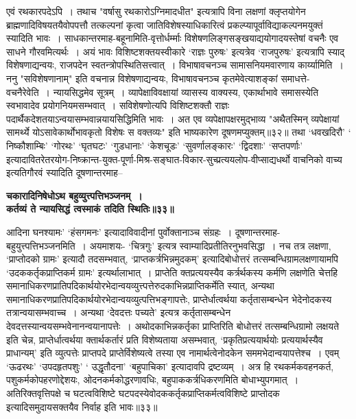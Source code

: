 {{{{एवं रथकारपदेऽपि~।
तथाच "वर्षासु रथकारोऽग्निमादधीत" इत्यत्रापि विना लक्षणां क्लृप्तयोगेन ब्राह्मणादिविषयतयैवोपपत्तौ तत्कल्पनां कृत्वा जातिविशेषस्याधिकारित्वं प्रकल्प्यापूर्वाविद्याकल्पनमयुक्तं स्यादिति भावः~।
 साधकान्तरमाह-बहूनामिति-वृत्तोर्धर्म्माः विशेषणलिङ्गसङ्खयाद्ययोगादयस्तेषां वचनैः {एव} साधने गौरवमित्यर्थः~।
 अयं भावः विशिष्टशक्तयस्वीकारे `राज्ञः पुरुषः' इत्यत्रेव `राजपुरुषः' इत्यत्रापि स्याद् विशेषणाद्यन्वयः, राजपदेन स्वतन्त्रोपस्थितिसत्त्वात्~।
विभाषावचनञ्च सामासनियमवारणाय कार्य्यामिति~।
 ननु "सविशेषणानाम्" इति वचनान्न विशेषणाद्यन्वयः, विभाषावचनञ्च कृतमेवेत्याशङ्कां समाधत्ते-वचनैरेवेति~।
न्यायसिद्धमेव सूत्रम्~।
व्यापेक्षाविवक्षायां {व्यासस्य} वाक्यस्य, एकार्थाभावे समासस्येति स्वभावादेव प्रयोगनियमसम्भवात्~।
सविशेषणोत्यपि विशिष्टशक्तौ राज्ञः पदार्थैकदेशतयाऽन्वयासम्भवान्नयायसिद्धिमिति भावः~।
 अत एव व्यपेक्षापक्षरमुद्भाव्य "अथैतस्मिन् व्यपेक्षायां सामर्थ्ये योऽसावेकार्थोभावकृतो विशेषः स वक्तव्यः" इति भाष्यकारेण दूषणमप्युक्तम्॥३२॥
 तथा `धवखदिरौ' ` निष्कौशाम्बिः' `गोरथः' `घृतघटः' `गुडधानाः' `केशचूडः' `सुवर्णालङ्कारः' `द्विदशाः' `सप्तपर्णाः' इत्यादावितरेतरयोग-निष्क्रान्त-युक्त-पूर्णा-मिश्र-सङ्घात-विकार-सुच्प्रत्ययलोप-वीप्साद्यधर्थो वाचनिको वाच्य इत्यतिगौरवं स्यादिति दूषणान्तरमाह--
\begin{center}{\bfseries चकारादिनिषेधोऽथ बहुव्युत्त्पत्तिभञ्जनम्~।\\
कर्तव्यं ते न्यायसिद्धं त्वस्माकं तदिति स्थितिः॥३३॥ }\end{center}
 आदिना घनश्यामः' `हंसगमनः' इत्यादाविवादीनां पुर्वोक्तानाञ्च संग्रहः~।
दूषणान्तरमाह-बहुयुत्त्पत्तिभञ्जनमिति~।
अयमाशयः- `चित्रगुः' इत्यत्र स्वाम्यादिप्रतीतिरनुभवसिद्धा~।
 नच तत्र लक्षणा, `प्राप्तोदको ग्रामः' इत्यादौ तदसम्भवात्, `प्राप्तकर्त्रभिन्नमुदकम्' इत्यादिबोधोत्तरं तत्सम्बन्धिग्रामलक्षणायामपि `उदककर्तृकप्राप्तिकर्म ग्रामः' इत्यर्थालाभात्~।
 प्राप्तेति क्तप्रत्ययस्यैव कर्त्रर्थकस्य कर्मणि लक्षणेति चेत्तहि समानाधिकरणप्रातिपदिकार्थयोरभेदान्वयव्युत्त्पत्तेरुदकाभिन्नप्राप्तिकर्मेति स्यात्, अन्यथा समानाधिकरणप्रातिपदिकार्थयोरभेदान्वयव्युत्पत्तिभङ्गापत्तेः, प्राप्तेर्धात्वर्थया कर्तृतासम्बन्धेन भेदेनोदकस्य तत्रान्वयासम्भवाच्च~।
अन्यथा `देवदत्तः पच्यते' इत्यत्र कर्तृतासम्बन्धेन देवदत्तस्यान्वयसम्भवेनानन्वयानापत्तेः~।
 अथोदकाभिन्नकर्तृका प्राप्तिरिति बोधोत्तरं तत्सम्बन्धिग्रामो लक्षयते इति चेन्न, प्राप्तेर्धात्वर्थया क्तार्थकर्तारं प्रति विशेष्यताया असम्भवात्, `प्रकृतिप्रत्ययार्थयोः प्रत्ययार्थस्यैव प्राधान्यम्' इति व्युत्पत्तेः प्राप्तपदे प्राप्तेर्विशेष्यत्वे तस्या एव नामार्थत्वेनोदकेन सममभेदान्वयापत्तेश्च~।
 एवम् `ऊढरथः' `उपदहृतपशुः' ` उद्धृतौदना' `बहुपाचिका' इत्यादावपि द्रष्टव्यम्~।
अत्र हि रथकर्मकवहनकर्त, पशुकर्मकोपहरणोद्देशयः, ओदनकर्मकोद्धरणावधिः, बहुपाककर्त्रधिकरणमिति बोधाभ्युपगमात्~।
अतिरिक्तवृत्तिपक्षे च घटत्वविशिष्टे घटपदस्येवोदककर्तृकप्राप्तिकर्मत्वविशिष्टे प्राप्तोदक इत्यादिसमुदायसक्तयैव निर्वाह इति भावः॥३३॥

}}}}
